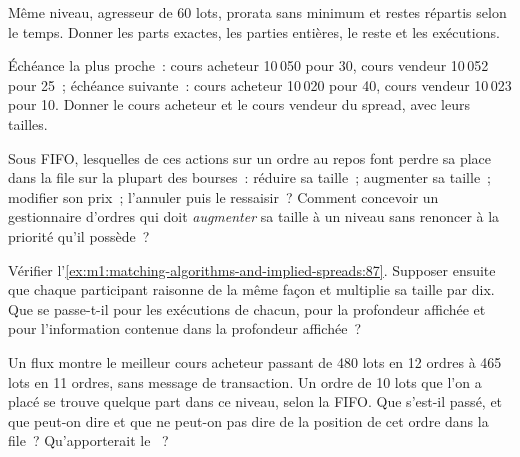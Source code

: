 \begin{exercise}[$\star$]\label{exo:m1:matching-algorithms-and-implied-spreads:2}
Même niveau, agresseur de 60 lots, prorata sans minimum et restes répartis selon
le temps. Donner les parts exactes, les parties entières, le reste et les exécutions.
\end{exercise}

\begin{exercise}[$\star$]\label{exo:m1:matching-algorithms-and-implied-spreads:3}
Échéance la plus proche~: cours acheteur 10\,050 pour 30, cours vendeur 10\,052 pour 25~; échéance
suivante~: cours acheteur 10\,020 pour 40, cours vendeur 10\,023 pour 10. Donner le cours acheteur et le
cours vendeur  du spread, avec leurs tailles.
\end{exercise}

\begin{exercise}[$\star\star$]\label{exo:m1:matching-algorithms-and-implied-spreads:4}
Sous FIFO, lesquelles de ces actions sur un ordre au repos font perdre sa place dans la
file sur la plupart des bourses~: réduire sa taille~; augmenter sa taille~; modifier son
prix~; l'annuler puis le ressaisir~? Comment concevoir un gestionnaire d'ordres
qui doit \emph{augmenter} sa taille à un niveau sans renoncer à
la priorité qu'il possède~?
\end{exercise}

\begin{exercise}[$\star\star$]\label{exo:m1:matching-algorithms-and-implied-spreads:5}
Vérifier l'\cref{ex:m1:matching-algorithms-and-implied-spreads:87}. Supposer ensuite que
chaque participant raisonne de la même façon et multiplie sa taille par dix. Que se passe-t-il
pour les exécutions de chacun, pour la profondeur affichée et pour l'information
contenue dans la profondeur affichée~?
\end{exercise}

\begin{exercise}[$\star\star$]\label{exo:m1:matching-algorithms-and-implied-spreads:6}
Un flux  montre le meilleur cours acheteur passant de 480 lots en 12 ordres à
465 lots en 11 ordres, sans message de transaction. Un ordre de 10 lots que l'on a placé
se trouve quelque part dans ce niveau, selon la FIFO. Que s'est-il passé, et que peut-on dire
et que ne peut-on pas dire de la position de cet ordre dans la file~? Qu'apporterait le ~?
\end{exercise}

